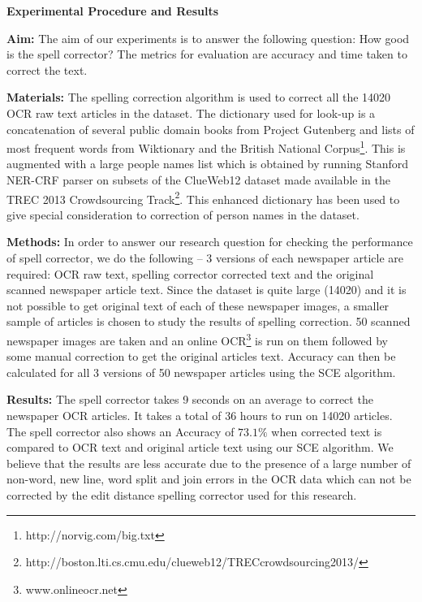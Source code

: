 \documentclass[preprint,11pt]{elsarticle}
\begin{document}
\noindent \textbf{Experimental Procedure and Results}

\noindent \textbf{Aim: }The aim of our experiments is to answer the following question:
How good is the spell corrector? The metrics for evaluation are accuracy and time taken to correct the text.


\noindent \textbf{Materials: }The spelling correction algorithm is used to correct all the 14020 OCR raw text articles in the dataset. The dictionary used for look-up is a concatenation of several public domain books from Project Gutenberg and lists of most frequent words from Wiktionary and the British National Corpus\footnote{http://norvig.com/big.txt}. This is augmented with a large people names list which is obtained  by running Stanford NER-CRF parser on subsets of the ClueWeb12 dataset made available in the TREC 2013 Crowdsourcing Track\footnote{http://boston.lti.cs.cmu.edu/clueweb12/TRECcrowdsourcing2013/}. This enhanced dictionary has been used to give special consideration to correction of person names in the dataset.

\noindent \textbf{Methods: }In order to answer our research question for checking the performance of spell corrector, we do the following -- 3 versions of each newspaper article are required: OCR raw text, spelling corrector corrected text and the original scanned newspaper article text. Since the dataset is quite large (14020) and it is not possible to get original text of each of these newspaper images, a smaller sample of articles is chosen to study the results of spelling correction. 50 scanned newspaper images are taken and an online OCR\footnote{www.onlineocr.net} is run on them followed by some manual correction to get the original articles text. Accuracy can then be calculated for all 3 versions of 50 newspaper articles using the SCE algorithm. 

\noindent \textbf{Results: }
The spell corrector takes 9 seconds on an average to correct the newspaper OCR articles. It takes a total of 36 hours to run on 14020 articles.
The spell corrector also shows an Accuracy of $73.1 \%$  when corrected text is compared to OCR text and original article text using our SCE algorithm. We believe that the results are less accurate due to the presence of a large number of non-word, new line, word split and join errors in the OCR data which can not be corrected by the edit distance spelling corrector used for this research. 
\end{document}
